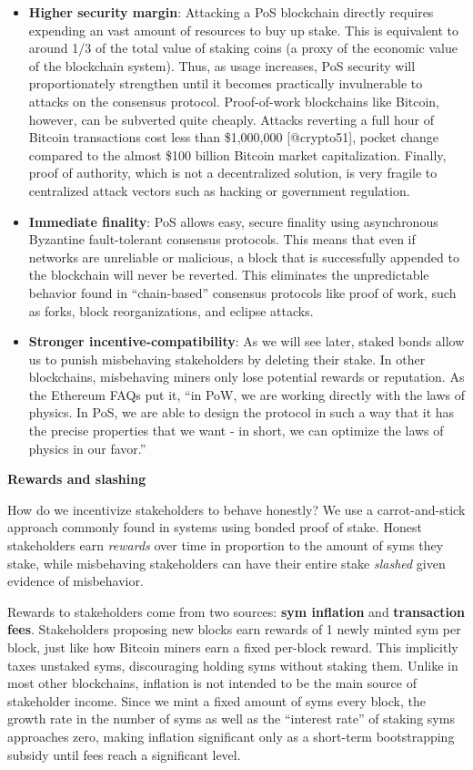 \documentclass[]{article}
\providecommand{\tightlist}{%
  \setlength{\itemsep}{0pt}\setlength{\parskip}{0pt}}
\begin{document}
\begin{itemize}
\tightlist
\item
  \textbf{Higher security margin}: Attacking a PoS blockchain directly
  requires expending an vast amount of resources to buy up stake. This
  is equivalent to around 1/3 of the total value of staking coins (a
  proxy of the economic value of the blockchain system). Thus, as usage
  increases, PoS security will proportionately strengthen until it
  becomes practically invulnerable to attacks on the consensus protocol.
  Proof-of-work blockchains like Bitcoin, however, can be subverted
  quite cheaply. Attacks reverting a full hour of Bitcoin transactions
  cost less than \$1,000,000 {[}@crypto51{]}, pocket change compared to
  the almost \$100 billion Bitcoin market capitalization. Finally, proof
  of authority, which is not a decentralized solution, is very fragile
  to centralized attack vectors such as hacking or government
  regulation.
\item
  \textbf{Immediate finality}: PoS allows easy, secure finality using
  asynchronous Byzantine fault-tolerant consensus protocols. This means
  that even if networks are unreliable or malicious, a block that is
  successfully appended to the blockchain will never be reverted. This
  eliminates the unpredictable behavior found in ``chain-based''
  consensus protocols like proof of work, such as forks, block
  reorganizations, and eclipse attacks.
\item
  \textbf{Stronger incentive-compatibility}: As we will see later,
  staked bonds allow us to punish misbehaving stakeholders by deleting
  their stake. In other blockchains, misbehaving miners only lose
  potential rewards or reputation. As the Ethereum FAQs put it, ``in
  PoW, we are working directly with the laws of physics. In PoS, we are
  able to design the protocol in such a way that it has the precise
  properties that we want - in short, we can optimize the laws of
  physics in our favor.''
\end{itemize}

\textbf{Rewards and slashing}

How do we incentivize stakeholders to behave honestly? We use a
carrot-and-stick approach commonly found in systems using bonded proof
of stake. Honest stakeholders earn \emph{rewards} over time in
proportion to the amount of syms they stake, while misbehaving
stakeholders can have their entire stake \emph{slashed} given evidence
of misbehavior.

Rewards to stakeholders come from two sources: \textbf{sym inflation}
and \textbf{transaction fees}. Stakeholders proposing new blocks earn
rewards of 1 newly minted sym per block, just like how Bitcoin miners
earn a fixed per-block reward. This implicitly taxes unstaked syms,
discouraging holding syms without staking them. Unlike in most other
blockchains, inflation is not intended to be the main source of
stakeholder income. Since we mint a fixed amount of syms every block,
the growth rate in the number of syms as well as the ``interest rate''
of staking syms approaches zero, making inflation significant only as a
short-term bootstrapping subsidy until fees reach a significant level.
\end{document}
